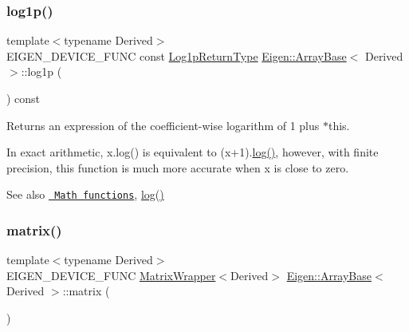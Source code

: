 \subsubsection{\texorpdfstring{log1p()}{log1p()}}
{\footnotesize\ttfamily template$<$typename Derived$>$ \\
E\+I\+G\+E\+N\+\_\+\+D\+E\+V\+I\+C\+E\+\_\+\+F\+U\+NC const \mbox{\hyperlink{class_eigen_1_1_cwise_unary_op}{Log1p\+Return\+Type}} \mbox{\hyperlink{class_eigen_1_1_array_base}{Eigen\+::\+Array\+Base}}$<$ Derived $>$\+::log1p (\begin{DoxyParamCaption}{ }\end{DoxyParamCaption}) const\hspace{0.3cm}{\ttfamily [inline]}}

\begin{DoxyReturn}{Returns}
an expression of the coefficient-\/wise logarithm of 1 plus {\ttfamily $\ast$this}.
\end{DoxyReturn}
In exact arithmetic, {\ttfamily x.\+log()} is equivalent to {\ttfamily }(x+1).\mbox{\hyperlink{class_eigen_1_1_array_base_a7748ba1f6891fa4e10723a8bf77b8770}{log()}}, however, with finite precision, this function is much more accurate when {\ttfamily x} is close to zero.

\begin{DoxySeeAlso}{See also}
\href{group__CoeffwiseMathFunctions.html\#cwisetable_log1p}{\texttt{ Math functions}}, \mbox{\hyperlink{class_eigen_1_1_array_base_a7748ba1f6891fa4e10723a8bf77b8770}{log()}} 
\end{DoxySeeAlso}
\mbox{\label{class_eigen_1_1_array_base_ac513167ec762bbf639dc375d314d91d3}} 
\subsubsection{\texorpdfstring{matrix()}{matrix()}}
{\footnotesize\ttfamily template$<$typename Derived$>$ \\
E\+I\+G\+E\+N\+\_\+\+D\+E\+V\+I\+C\+E\+\_\+\+F\+U\+NC \mbox{\hyperlink{class_eigen_1_1_matrix_wrapper}{Matrix\+Wrapper}}$<$Derived$>$ \mbox{\hyperlink{class_eigen_1_1_array_base}{Eigen\+::\+Array\+Base}}$<$ Derived $>$\+::matrix (\begin{DoxyParamCaption}{ }\end{DoxyParamCaption})\hspace{0.3cm}{\ttfamily [inline]}}

